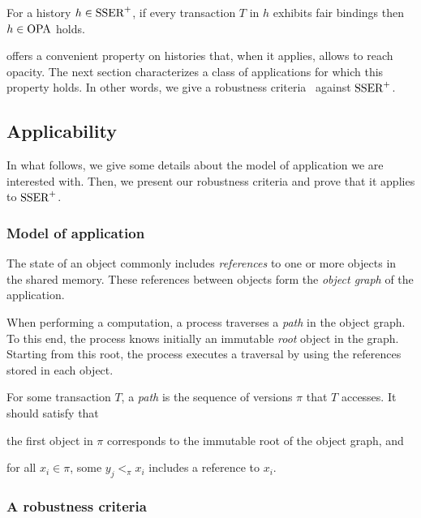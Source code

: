 \begin{proposition}
  For a history $h \in \SPSER$, if every transaction $T$ in $h$ exhibits fair bindings then $h \in \OPA$ holds.
\end{proposition}

 offers a convenient property on histories that, when it applies, allows to reach opacity.
The next section characterizes a class of applications for which this property holds.
In other words, we give a robustness criteria~\cite{CeroneG16} against $\SPSER$.

\subsection{Applicability}

In what follows, we give some details about the model of application we are interested with.
Then, we present our robustness criteria and prove that it applies to $\SPSER$.

\subsubsection{Model of application}

The state of an object commonly includes \emph{references} to one or more objects in the shared memory.
These references between objects form the \emph{object graph} of the application.

When performing a computation, a process traverses a \emph{path} in the object graph.
To this end, the process knows initially an immutable \emph{root} object in the graph.
Starting from this root, the process executes a traversal by using the references stored in each object.

For some transaction $T$, a \emph{path} is the sequence of versions $\pi$ that $T$ accesses.
It should satisfy that 
\begin{inparaenum}
\item the first object in $\pi$ corresponds to the immutable root of the object graph, and
\item for all $x_i \in \pi$, some $y_j <_{\pi} x_i$ includes a reference to $x_i$.
\end{inparaenum}

\subsubsection{A robustness criteria}

